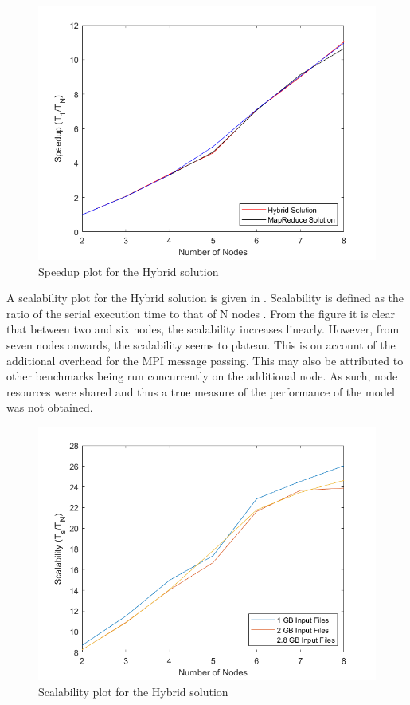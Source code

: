 \documentclass[12pt,twocolumn]{witseiepaper}
\begin{document}
\begin{figure}[h]
	\centering
	\includegraphics[width=1\columnwidth]{hybrid-speedup.png}
	\caption{Speedup plot for the Hybrid solution}
	\raggedright
	\label{fig:speedUpH}	
\end{figure}

A scalability plot for the Hybrid solution is given in . Scalability is defined as the ratio of the serial execution time to that of N nodes \cite{speedup}. From the figure it is clear that between two and six nodes, the scalability increases linearly. However, from seven nodes onwards, the scalability seems to plateau. This is on account of the additional overhead for the MPI message passing. This may also be attributed to other benchmarks being run concurrently on the additional node. As such, node resources were shared and thus a true measure of the performance of the model was not obtained.

\begin{figure}[h]
	\centering
	\includegraphics[width=1\columnwidth]{scalability.png}
	\caption{Scalability plot for the Hybrid solution}
	\raggedright
	\label{fig:scalabilty}	
\end{figure}
\end{document}
